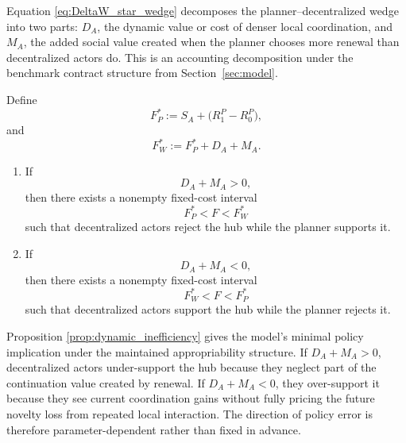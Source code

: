 Equation \eqref{eq:DeltaW_star_wedge} decomposes the planner--decentralized wedge into two parts: $D_A$, the dynamic value or cost of denser local coordination, and $M_A$, the added social value created when the planner chooses more renewal than decentralized actors do. This is an accounting decomposition under the benchmark contract structure from Section~\ref{sec:model}.

\begin{proposition}
\label{prop:dynamic_inefficiency}
Define
\begin{equation}
F_P^*
:=
S_A+\bigl(R_1^P-R_0^P\bigr),
\label{eq:FPstar}
\end{equation}
and
\begin{equation}
F_W^*
:=
F_P^*+D_A+M_A.
\label{eq:FWstar}
\end{equation}

\begin{enumerate}[leftmargin=2em]
    \item If
    \begin{equation}
    D_A+M_A>0,
    \label{eq:under_support_condition}
    \end{equation}
    then there exists a nonempty fixed-cost interval
    \begin{equation}
    F_P^*<F<F_W^*
    \label{eq:under_support_interval}
    \end{equation}
    such that decentralized actors reject the hub while the planner supports it.

    \item If
    \begin{equation}
    D_A+M_A<0,
    \label{eq:over_support_condition}
    \end{equation}
    then there exists a nonempty fixed-cost interval
    \begin{equation}
    F_W^*<F<F_P^*
    \label{eq:dynamic_inefficiency_interval}
    \end{equation}
    such that decentralized actors support the hub while the planner rejects it.
\end{enumerate}
\end{proposition}

Proposition \ref{prop:dynamic_inefficiency} gives the model's minimal policy implication under the maintained appropriability structure. If $D_A+M_A>0$, decentralized actors under-support the hub because they neglect part of the continuation value created by renewal. If $D_A+M_A<0$, they over-support it because they see current coordination gains without fully pricing the future novelty loss from repeated local interaction. The direction of policy error is therefore parameter-dependent rather than fixed in advance.

